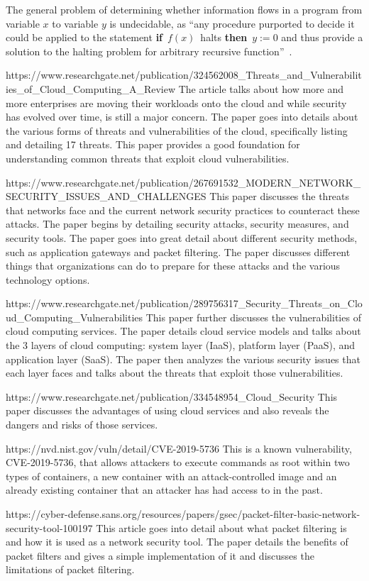 The general problem of determining whether information flows in a program from
variable $x$ to variable $y$ is undecidable, as ``any procedure purported to
decide it could be applied to the statement {\bf if}~$f(x)$~halts {\bf then}~$y
:= 0$ and thus provide a solution to the halting problem for arbitrary
recursive function''~\cite{denning-impossible}.  

https://www.researchgate.net/publication/324562008_Threats_and_Vulnerabilities_of_Cloud_Computing_A_Review
The article talks about how more and more enterprises are moving their workloads onto the cloud and while
security has evolved over time, is still a major concern. The paper goes into details about the various forms
of threats and vulnerabilities of the cloud, specifically listing and detailing 17 threats. This paper
provides a good foundation for understanding common threats that exploit cloud vulnerabilities.

https://www.researchgate.net/publication/267691532_MODERN_NETWORK_SECURITY_ISSUES_AND_CHALLENGES
This paper discusses the threats that networks face and the current network security practices to counteract these attacks.
The paper begins by detailing security attacks, security measures, and security tools. The paper goes into great detail about
different security methods, such as application gateways and packet filtering. The paper discusses different things that organizations
can do to prepare for these attacks and the various technology options.

https://www.researchgate.net/publication/289756317_Security_Threats_on_Cloud_Computing_Vulnerabilities
This paper further discusses the vulnerabilities of cloud computing services. The paper details cloud service models and talks about
the 3 layers of cloud computing: system layer (IaaS), platform layer (PaaS), and application layer (SaaS). The paper then analyzes
the various security issues that each layer faces and talks about the threats that exploit those vulnerabilities.

https://www.researchgate.net/publication/334548954_Cloud_Security
This paper discusses the advantages of using cloud services and also reveals the dangers and risks of those services.

https://nvd.nist.gov/vuln/detail/CVE-2019-5736
This is a known vulnerability, CVE-2019-5736, that allows attackers to execute commands as root within two types of containers,
a new container with an attack-controlled image and an already existing container that an attacker has had access to in the past.

https://cyber-defense.sans.org/resources/papers/gsec/packet-filter-basic-network-security-tool-100197
This article goes into detail about what packet filtering is and how it is used as a network security tool.
The paper details the benefits of packet filters and gives a simple implementation of it and discusses
the limitations of packet filtering.